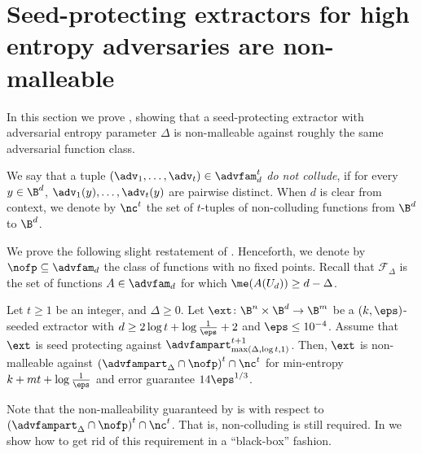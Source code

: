 %
\section{Seed-protecting  %
extractors for high entropy adversaries are non-malleable}\label{sec:the delta proof}

In this section we prove , showing that a seed-protecting extractor with adversarial entropy parameter $\Delta$
is non-malleable against roughly the same adversarial function class.



\begin{definition}
	We say that a tuple $(\adv_1,\ldots,\adv_t) \in \advfam_d^t$ 
	\emph{do not collude}, if for every $y \in \B^d$, $\adv_1(y),\ldots,\adv_{t}(y)$ are pairwise distinct. 
	When $d$ is clear from context, we denote by $\nc^t$ the set of $t$-tuples of non-colluding
	functions from $\B^d$ to $\B^d$. %
\end{definition}



We prove the following slight restatement of . Henceforth, we denote by
$\nofp \subseteq \advfam_d$ the class of functions with no fixed points. Recall that $\mathcal{F}_{\Delta}$ is the set of functions $A \in \advfam_d$ for which $\me(A(U_d)) \ge d-\Delta$.

\begin{theorem}\label{t: sp to nm}
Let $t \ge 1$ be an integer, and $\Delta \ge 0$.
Let $\ext\colon\B^{n}\times\B^{d}\rightarrow\B^m$ be a $(k,\eps)$-seeded extractor with $d \ge 2\log{t} + \log\frac1{\eps} + 2$ and $\eps \leq 10^{-4}$. Assume that $\ext$ is seed protecting against $\advfampart^{t+1}_{\max(\Delta, \log t,1)}$. Then, $\ext$ is non-malleable against $\left(\advfampart_{\Delta} \cap \nofp\right)^t \cap \nc^t$  for min-entropy $k+mt+\log\frac1{\eps}$ and error guarantee $14 \eps^{1/3}$.
\end{theorem}

Note that the non-malleability guaranteed by  is with respect to $\left(\advfampart_{\Delta} \cap \nofp\right)^t \cap \nc^t$. That is, non-colluding is still required. In  we show how to get rid of this requirement in a ``black-box'' fashion.

